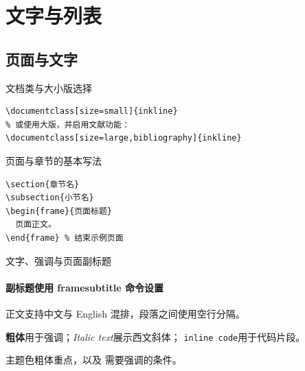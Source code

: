 \section{文字与列表}
\subsection{页面与文字}

\begin{frame}[fragile]{文档类与大小版选择}
  \begin{verbatim}
\documentclass[size=small]{inkline}
% 或使用大版，并启用文献功能：
\documentclass[size=large,bibliography]{inkline}
  \end{verbatim}
\end{frame}

\begin{frame}[fragile]{页面与章节的基本写法}
  \begin{verbatim}
\section{章节名}
\subsection{小节名}
\begin{frame}{页面标题}
  页面正文。
\end{frame} % 结束示例页面
  \end{verbatim}
\end{frame}

\begin{frame}{文字、强调与页面副标题}
  \framesubtitle{副标题使用 framesubtitle 命令设置}
  正文支持中文与 English 混排，段落之间使用空行分隔。

  \textbf{粗体}用于强调；\textit{Italic text}展示西文斜体；
  \texttt{inline code}用于代码片段。

  \alert{主题色粗体重点}，以及 \alert{需要强调的条件}。
\end{frame}


